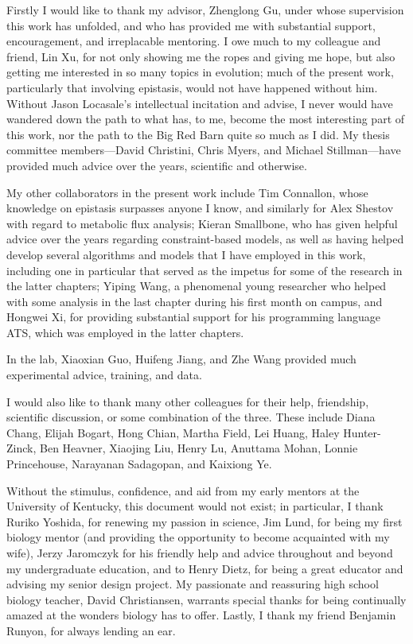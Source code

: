 \documentclass[phd,tocprelim,draft]{cornell}
\begin{document}
\begin{acknowledgements}
Firstly I would like to thank my advisor,  Zhenglong Gu, under
whose supervision this work has unfolded, and who has provided me with
substantial support, encouragement, and irreplacable mentoring. I owe
much to my colleague and friend, Lin Xu, for not only showing me
the ropes and giving me hope, but also getting me interested in so
many topics in evolution; much of the present work, particularly that
involving epistasis, would not have happened without him. Without
Jason Locasale's intellectual incitation and advise, I never would
have wandered down the path to what has, to me, become the most
interesting part of this work, nor the path to the Big Red Barn quite
so much as I did. My thesis committee members---David Christini,
Chris Myers, and Michael Stillman---have provided much advice
over the years, scientific and otherwise.

My other collaborators in the present work include Tim Connallon,
whose knowledge on epistasis surpasses anyone I know, and similarly
for Alex Shestov with regard to metabolic flux analysis;
Kieran Smallbone, who has given helpful advice over the years 
regarding constraint-based models, as well as having helped develop several  
algorithms and models that I have employed in this work, including one in 
particular that served as the impetus for some of the research in the latter 
chapters; Yiping Wang, a phenomenal young researcher who helped
with some analysis in the last chapter during his first month on
campus, and Hongwei Xi, for providing substantial support for his
programming language ATS, which was employed in the latter chapters.

In the lab, Xiaoxian Guo, Huifeng Jiang, and Zhe Wang
provided much experimental advice, training, and data.

I would also like to thank many other colleagues for their help,
friendship, scientific discussion, or some combination of
the three. These include Diana Chang, Elijah Bogart, 
Hong Chian, Martha Field, Lei Huang,
Haley Hunter-Zinck, Ben Heavner, Xiaojing Liu, Henry Lu, Anuttama Mohan,
Lonnie Princehouse, Narayanan Sadagopan, and Kaixiong Ye.

Without the stimulus, confidence, and aid from my early mentors at the
University of Kentucky, this document would not exist; in particular,
I thank Ruriko Yoshida, for renewing my passion in science,
Jim Lund, for being my first biology mentor (and providing the
opportunity to become acquainted with my wife), Jerzy Jaromczyk
for his friendly help and advice throughout and beyond my
undergraduate education, and to Henry Dietz, for being a great
educator and advising my senior design project.  My passionate and
reassuring high school biology teacher, David Christiansen,
warrants special thanks for being continually amazed at the wonders
biology has to offer. Lastly, I thank my friend Benjamin Runyon,
for always lending an ear.
\end{acknowledgements}
\end{document}
